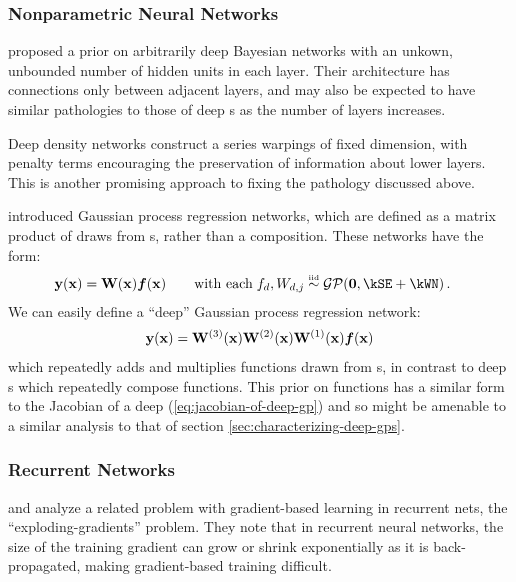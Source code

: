 \subsubsection{Nonparametric Neural Networks}
\citet{adams2010learning} proposed a prior on arbitrarily deep Bayesian networks with an unkown, unbounded number of hidden units in each layer.
Their architecture has connections only between adjacent layers, and may also be expected to have similar pathologies to those of deep \gp{}s as the number of layers increases.

Deep density networks \citep{rippel2013high} construct a series warpings of fixed dimension, with penalty terms encouraging the preservation of information about lower layers.
This is another promising approach to fixing the pathology discussed above.

\citet{wilson2012gaussian} introduced Gaussian process regression networks, which are defined as a matrix product of draws from \gp{}s, rather than a composition.
These networks have the form:
%
\begin{align}
\vy(\vx) & = \vW(\vx) \vf(\vx) \qquad \textnormal{with each} \; f_{d}, W_{d,j} \simiid \GPt{\vzero}{\kSE + \kWN} .
\end{align}
%
We can easily define a ``deep'' Gaussian process regression network:
%
\begin{align}
{\bf{y}}({\bf{x}}) = \mathbf{W}^{(3)}({\bf{x}}) \mathbf{W}^{(2)}({\bf{x}}) \mathbf{W}^{(1)}({\bf{x}}) \boldsymbol{f}({\bf{x}})
\end{align}
%
which repeatedly adds and multiplies functions drawn from \gp{}s, in contrast to deep \gp{}s which repeatedly compose functions.
This prior on functions has a similar form to the Jacobian of a deep \gp{} (\cref{eq:jacobian-of-deep-gp}) and so might be amenable to a similar analysis to that of section \ref{sec:characterizing-deep-gps}.

%
%
%




\subsubsection{Recurrent Networks}
\cite{bengio1994learning} and \cite{pascanu2012understanding} analyze a related problem with gradient-based learning in recurrent nets, the ``exploding-gradients'' problem.
They note that in recurrent neural networks, the size of the training gradient can grow or shrink exponentially as it is back-propagated, making gradient-based training difficult.

